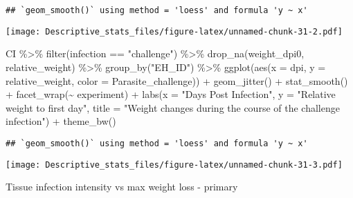 \documentclass[
]{article}
\newenvironment{Shaded}{\begin{snugshade}}{\end{snugshade}}
\newcommand{\AttributeTok}[1]{\textcolor[rgb]{0.77,0.63,0.00}{#1}}
\newcommand{\FunctionTok}[1]{\textcolor[rgb]{0.00,0.00,0.00}{#1}}
\newcommand{\NormalTok}[1]{#1}
\newcommand{\SpecialCharTok}[1]{\textcolor[rgb]{0.00,0.00,0.00}{#1}}
\newcommand{\StringTok}[1]{\textcolor[rgb]{0.31,0.60,0.02}{#1}}
\begin{document}
\begin{verbatim}
## `geom_smooth()` using method = 'loess' and formula 'y ~ x'
\end{verbatim}

\texttt{[image: Descriptive\_stats\_files/figure-latex/unnamed-chunk-31-2.pdf]}

\begin{Shaded}
\begin{Highlighting}[]
\NormalTok{CI }\SpecialCharTok{\%\textgreater{}\%} 
    \FunctionTok{filter}\NormalTok{(infection }\SpecialCharTok{==} \StringTok{"challenge"}\NormalTok{) }\SpecialCharTok{\%\textgreater{}\%}
    \FunctionTok{drop\_na}\NormalTok{(weight\_dpi0, relative\_weight) }\SpecialCharTok{\%\textgreater{}\%}
    \FunctionTok{group\_by}\NormalTok{(}\StringTok{"EH\_ID"}\NormalTok{) }\SpecialCharTok{\%\textgreater{}\%}
    \FunctionTok{ggplot}\NormalTok{(}\FunctionTok{aes}\NormalTok{(}\AttributeTok{x =}\NormalTok{ dpi, }\AttributeTok{y =}\NormalTok{ relative\_weight, }\AttributeTok{color =}\NormalTok{ Parasite\_challenge)) }\SpecialCharTok{+}
    \FunctionTok{geom\_jitter}\NormalTok{() }\SpecialCharTok{+}
    \FunctionTok{stat\_smooth}\NormalTok{() }\SpecialCharTok{+}
    \FunctionTok{facet\_wrap}\NormalTok{(}\SpecialCharTok{\textasciitilde{}}\NormalTok{ experiment) }\SpecialCharTok{+}
    \FunctionTok{labs}\NormalTok{(}\AttributeTok{x =} \StringTok{"Days Post Infection"}\NormalTok{, }\AttributeTok{y =} \StringTok{"Relative weight to first day"}\NormalTok{,}
         \AttributeTok{title =} \StringTok{"Weight changes during the course of the challenge infection"}\NormalTok{) }\SpecialCharTok{+}
    \FunctionTok{theme\_bw}\NormalTok{()}
\end{Highlighting}
\end{Shaded}

\begin{verbatim}
## `geom_smooth()` using method = 'loess' and formula 'y ~ x'
\end{verbatim}

\texttt{[image: Descriptive\_stats\_files/figure-latex/unnamed-chunk-31-3.pdf]}

Tissue infection intensity vs max weight loss - primary
\end{document}
